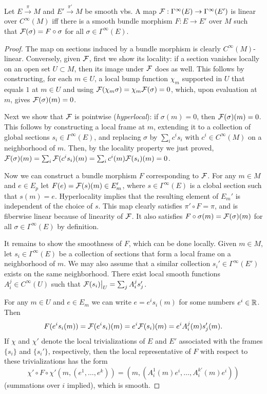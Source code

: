 \begin{lem}
    Let $E\overset{\pi}{\to}M$ and $E'\overset{\pi'}{\to}M$ be smooth \glspl{vb}. A map $\mathcal{F}:\Gamma^\infty(E)\to \Gamma^\infty(E')$ is linear over $C^\infty(M)$ iff there is a smooth bundle morphism $F:E\to E'$ over $M$ such that $\mathcal{F}(\sigma)=F\circ\sigma$ for all $\sigma\in\Gamma^\infty(E)$.
\end{lem}
\begin{proof}
    The map on sections induced by a bundle morphism is clearly $C^\infty(M)$-linear. Conversely, given $\mathcal{F}$, first we show its locality: if a section vanishes locally on an open set $U\subset M$, then its image under $\mathcal{F}$ does as well. This follows by constructing, for each $m\in U$, a local bump function $\chi_m$ supported in $U$ that equals $1$ at $m\in U$ and using  $\mathcal{F}(\chi_m\sigma)=\chi_m\mathcal{F}(\sigma)=0$, which, upon evaluation at $m$, gives $\mathcal{F}(\sigma)(m)=0$.

    Next we show that $\mathcal{F}$ is pointwise (\emph{hyperlocal}): if $\sigma(m)=0$, then $\mathcal{F}(\sigma)(m)=0$. This follows by constructing a local frame at $m$, extending it to a collection of global sections $s_i\in\Gamma^\infty(E)$, and replacing $\sigma$ by $\sum_i c^is_i$ with $c^i\in C^\infty(M)$ on a neighborhood of $m$. Then, by the locality property we just proved, $\mathcal{F}(\sigma)(m)=\sum_i\mathcal{F}(c^is_i)(m)=\sum_i c^i(m)\mathcal{F}(s_i)(m)=0$.

    Now we can construct a bundle morphism $F$ corresponding to $\mathcal{F}$. For any $m\in M$ and $e\in E_p$ let $F(e)=\mathcal{F}(s)(m)\in E'_m$, where $s\in \Gamma^\infty(E)$ is a clobal section such that $s(m)=e$. Hyperlocality implies that the resulting element of $E_m'$ is independent of the choice of $s$. This map clearly satisfies $\pi'\circ F=\pi$, and is fiberwise linear because of linearity of $\mathcal{F}$. It also satisfies $F\circ\sigma(m)=\mathcal{F}(\sigma)(m)$ for all $\sigma\in\Gamma^\infty(E)$ by definition. 

    It remains to show the smoothness of $F$, which can be done locally. Given $m\in M$, let $s_i\in\Gamma^\infty(E)$ be a collection of sections that form a local frame on a neighborhood of $m$. We may also assume that a similar collection $s_i'\in\Gamma^\infty(E')$ exists on the same neighborhood. There exist local smooth functions $A_i^j\in C^\infty(U)$ such that $\restr{\calF(s_i)}{U}=\sum_j A_i^j s_j'$.

    For any $m\in U$ and $e\in E_m$ we can write $e=e^is_i(m)$ for some numbers $e^i\in\mathbb{R}$. Then 
    \[F(e^is_i(m))=\mathcal{F}(e^is_i)(m)=e^i\mathcal{F}(s_i)(m)=e^i A_i^j(m)s_j'(m).\]
    If $\chi$ and $\chi'$ denote the local trivializations of $E$ and $E'$ associated with the frames $\{s_i\}$ and $\{s_i'\}$, respectively, then the local representative of $F$ with respect to these trivializations has the form 
    \[\chi'\circ F\circ\chi'(m,(e^1,\ldots,e^k))=(m,(A_i^1(m)e^i,\ldots,A_i^{k'}(m)e^i))\]
    (summations over $i$ implied), which is smooth.
\end{proof}



